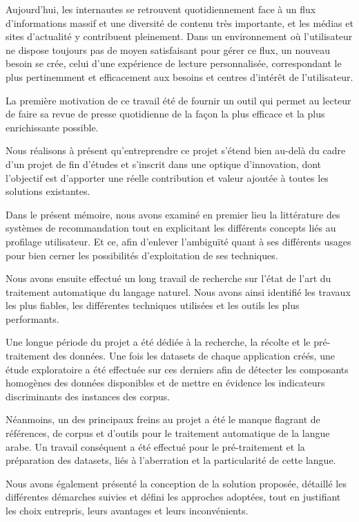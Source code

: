 
Aujourd’hui, les internautes se retrouvent quotidiennement face à un flux d’informations massif et une diversité de contenu très importante, et les médias et sites d’actualité y contribuent pleinement. Dans un environnement où l'utilisateur ne dispose toujours pas de moyen satisfaisant pour gérer ce flux, un nouveau besoin se crée, celui d’une expérience de lecture personnalisée, correspondant le plus pertinemment et efficacement aux besoins et centres d’intérêt de l’utilisateur.
 
La première motivation de ce travail été de fournir un outil qui permet au lecteur de faire sa revue de presse quotidienne de la façon la plus efficace et la plus enrichissante possible.
 
Nous réalisons à présent qu’entreprendre ce projet s'étend bien au-delà du cadre d’un projet de fin d'études et s'inscrit dans une optique d'innovation, dont l’objectif est d'apporter une réelle contribution et valeur ajoutée à toutes les solutions existantes.
 
Dans le présent mémoire, nous avons examiné en premier lieu la littérature des systèmes de recommandation tout en explicitant les différents concepts liés au profilage utilisateur. Et ce, afin d'enlever l’ambiguïté quant à ses différents usages pour bien cerner les possibilités d'exploitation de ses techniques.
 
Nous avons ensuite effectué un long travail de recherche sur l'état de l'art du traitement automatique du langage naturel. Nous avons ainsi identifié les travaux les plus fiables, les différentes techniques utilisées et les outils les plus performants.
 
Une longue période du projet a été dédiée à la recherche, la récolte et le pré-traitement des données. Une fois les datasets de chaque application créés, une étude exploratoire a été effectuée sur ces derniers afin de détecter les composants homogènes des données disponibles et de mettre en évidence les indicateurs discriminants des instances des corpus.

Néanmoins, un des principaux freins au projet a été le manque flagrant de références, de corpus et d'outils pour le traitement automatique de la langue arabe. Un travail conséquent a été effectué pour le pré-traitement et la préparation des datasets, liés à l’aberration et la particularité de cette langue.
 
Nous avons également présenté la conception de la solution proposée, détaillé les différentes démarches suivies et défini les approches adoptées, tout en justifiant les choix entrepris, leurs avantages et leurs inconvénients.
 

